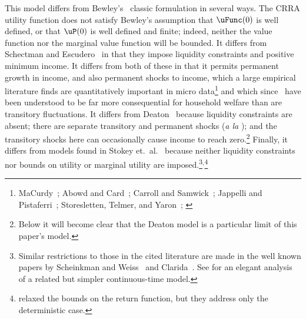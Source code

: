 \documentclass[BufferStockTheory]{subfiles}
\begin{document}

\hypertarget{DiffWithLit}{} This model differs from Bewley's~\citeyearpar{bewleyPIH} classic formulation in several ways. The CRRA utility function does not satisfy Bewley's assumption that $\uFunc(0)$ is well defined, or that $\uP(0)$ is well defined and finite; indeed, neither the value function nor the marginal value function will be bounded.  It differs from Schectman and Escudero~\citeyearpar{seIncFluct} in that they impose liquidity constraints and positive minimum income.  It differs from both of these in that it permits permanent growth in income, and also permanent shocks to income, which a large empirical literature finds are quantitatively important in micro data\footnote{MaCurdy~\citeyearpar{macurdyTimeseries}; Abowd and Card~\citeyearpar{acCovariance}; Carroll and Samwick~\citeyearpar{csNature}; Jappelli and Pistaferri~\citeyearpar{jpCins}; Storesletten, Telmer, and Yaron~\citeyearpar{styConsumption}; \cite{blpRisk}} and which since~\cite{friedmanATheory} have been understood to be far more consequential for household welfare than are transitory fluctuations.  It differs from Deaton~\citeyearpar{deatonLiqConstr} because liquidity constraints are absent; there are separate transitory and permanent shocks ({\it a la} \cite{muthOptimal}); and the transitory shocks here can occasionally cause income to reach zero.\footnote{Below it will become clear that the Deaton model is a particular limit of this paper's model.}  Finally, it differs from models found in Stokey et.\ al.~\citeyearpar{slpMethods} because neither liquidity constraints nor bounds on utility or marginal utility are imposed.\footnote{Similar restrictions to those in the cited literature are made in the well known papers by Scheinkman and Weiss~\citeyearpar{scheinkman&weiss:borrowing} and Clarida~\citeyearpar{claridaErgodic}.  See \cite{tocheUrisk} for an elegant analysis of a related but simpler continuous-time model.}$^{,}$\footnote{\cite{asHomogeneous} relaxed the bounds on the return function, but they address only the deterministic case.}
\end{document}
